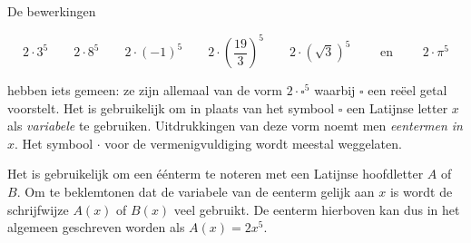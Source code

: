 \documentclass{ximera}
\begin{document}
	\author{Koen de Naeghel - Wiskunde Op Maat}
    \xmsource

	


De bewerkingen

\[
2\cdot 3^5
\qquad 2\cdot 8^5
\qquad 2\cdot (-1)^5
\qquad 2\cdot\left(\frac{19}{3}\right)^5
\qquad 2\cdot\left(\sqrt{3}\right)^5 
\qquad \text{ en } \qquad 2 \cdot \pi^5
\]


hebben iets gemeen: ze zijn allemaal van de vorm $2\cdot \square^5$ waarbij $\square$ een reëel getal voorstelt. Het is gebruikelijk om in plaats van het symbool $\square$ een Latijnse letter $x$ als \textit{ variabele} te gebruiken. Uitdrukkingen van deze vorm noemt men \textit{ eentermen in $x$}. Het symbool $\cdot$ voor de vermenigvuldiging wordt meestal weggelaten. 

Het is gebruikelijk om een éénterm te noteren met een Latijnse hoofdletter $A$ of $B$. Om te beklemtonen dat de variabele van de eenterm gelijk aan $x$  is wordt de schrijfwijze $A(x)$ of $B(x)$ veel gebruikt. De eenterm hierboven kan dus in het algemeen geschreven worden als $A(x) = 2x^5$.

\end{document}
